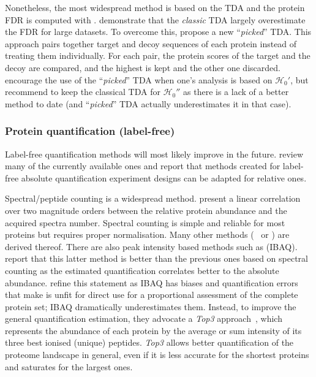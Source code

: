 Nonetheless, the most widespread method is based on the \gls{TDA}
and the protein \gls{FDR} is computed with .
\citet{Savitski2015-fx} demonstrate that the \emph{classic} \gls{TDA}
largely overestimate the \gls{FDR} for large datasets.
To overcome this,
\citet{Savitski2015-fx} propose a new \enquote{\emph{picked}} \gls{TDA}.
This approach pairs together target and decoy sequences of each protein
instead of treating them individually.
For each pair, the protein scores of the target and the decoy are compared,
and the highest is kept and the other one discarded.
\citet{The2016-ua} encourage the use of the \enquote{\emph{picked}} \gls{TDA}
when one's analysis is based on $\mathcal{H}_0'$,
but recommend to keep the classical \gls{TDA} for $\mathcal{H}_0''$
as there is a lack of a better method to date
(and \enquote{\emph{picked}} \gls{TDA} actually underestimates it in that case).\mybr\

\subsubsection{Protein quantification (label-free)}\label{subsubsec:protQuantLB}

Label-free quantification methods will most likely improve in the future.
\citet{Nikolov2012-hq} review many of the currently available ones and report that
methods created for label-free absolute quantification experiment designs
can be adapted for relative ones.\mybr\

Spectral/peptide counting is a widespread method.
\citet{Liu2004-cj} present a linear correlation over two magnitude orders
between the relative protein abundance and the acquired spectra number.
Spectral counting is simple and reliable for most proteins
but requires proper normalisation.
Many other methods (\eg\  or )
are derived thereof.
There are also peak intensity based methods such as  (\gls{IBAQ}).
\citet{Arike2012} report that this latter method is better than the previous ones
based on spectral counting as the estimated quantification correlates better to
the absolute abundance.
\citet{TOP3isbetter} refine this statement
as \gls{IBAQ} has biases and quantification errors
that make is unfit for direct
use for a proportional assessment of the complete protein set;
\gls{IBAQ} dramatically underestimates them.
Instead, to improve the general quantification estimation,
they advocate a \emph{Top3} approach~,
which represents the abundance of each protein by the average or sum intensity of
its three best ionised (unique) peptides.
\emph{Top3} allows better quantification of the proteome landscape in general,
even if it is less accurate for the shortest proteins and
saturates for the largest ones.\mybr\

